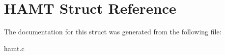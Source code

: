 \hypertarget{struct_h_a_m_t}{\section{H\-A\-M\-T Struct Reference}
\label{struct_h_a_m_t}
}


The documentation for this struct was generated from the following file\-:\begin{DoxyCompactItemize}
\item 
hamt.\-c\end{DoxyCompactItemize}
